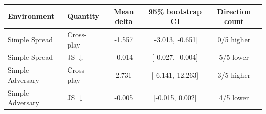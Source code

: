 \begin{tabular}{llccc}
\toprule
Environment & Quantity & Mean delta & 95\% bootstrap CI & Direction count \\
\midrule
Simple Spread & Cross-play & -1.557 & [-3.013, -0.651] & 0/5 higher \\
Simple Spread & JS $\downarrow$ & -0.014 & [-0.027, -0.004] & 5/5 lower \\
\midrule
Simple Adversary & Cross-play & 2.731 & [-6.141, 12.263] & 3/5 higher \\
Simple Adversary & JS $\downarrow$ & -0.005 & [-0.015, 0.002] & 4/5 lower \\
\bottomrule
\end{tabular}
